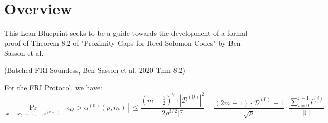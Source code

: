 %

\chapter*{Overview}

This Lean Blueprint seeks to be a guide towards the development of a formal proof of Theorem 8.2 of "Proximity Gaps for Reed Solomon Codes" by Ben-Sasson et al.

\begin{theorem}
  (Batched FRI Soundess, Ben-Sasson et al. 2020 Thm 8.2)

  For the FRI Protocol, we have:
  \begin{equation}
    \Pr_{x_1 \dots, x_t, z^{(0)}, \dots, z^{(r-1)}} \left[ \epsilon_Q > \alpha^{(0)}(\rho, m) \right]
    \le \frac{(m + \frac{1}{2})^7 \cdot |\mathcal{D}^{(0)}|^2}{2\rho^{3/2}|\mathbb{F}}
    + \frac{(2m+1) \cdot \mathcal{D}^{(0)}+1}{\sqrt{\rho}}
    \cdot \frac{\sum_{i=0}^{r-1} l^{(i)}}{|\mathbb{F}|}
  \end{equation}
\end{theorem}
